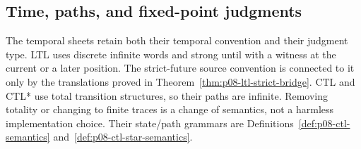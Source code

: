 
\subsection{Time, paths, and fixed-point judgments}

The temporal sheets retain both their temporal convention and their judgment
type.  LTL uses discrete infinite words and strong until with a witness at
the current or a later position.  The strict-future source convention is
connected to it only by the translations proved in
Theorem~\ref{thm:p08-ltl-strict-bridge}.  CTL and CTL* use total transition
structures, so their paths are infinite.  Removing totality or changing to
finite traces is a change of semantics, not a harmless implementation choice.
Their state/path grammars are Definitions~\ref{def:p08-ctl-semantics}
and~\ref{def:p08-ctl-star-semantics}.

